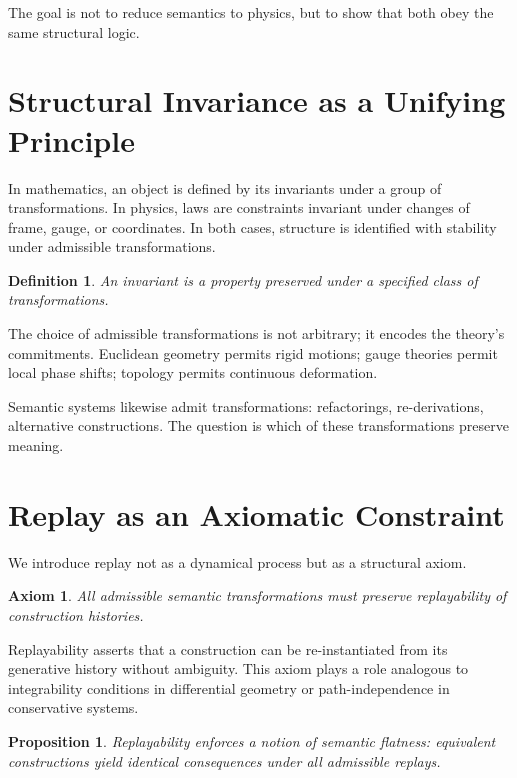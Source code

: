 \documentclass[11pt]{article}
\newtheorem{definition}{Definition}[section]
\newtheorem{axiom}{Axiom}[section]
\newtheorem{proposition}{Proposition}[section]
\begin{document}
The goal is not to reduce semantics to physics, but to show that both obey the same structural logic.

\section{Structural Invariance as a Unifying Principle}

In mathematics, an object is defined by its invariants under a group of transformations. In physics, laws are constraints invariant under changes of frame, gauge, or coordinates. In both cases, structure is identified with stability under admissible transformations.

\begin{definition}
An invariant is a property preserved under a specified class of transformations.
\end{definition}

The choice of admissible transformations is not arbitrary; it encodes the theory’s commitments. Euclidean geometry permits rigid motions; gauge theories permit local phase shifts; topology permits continuous deformation.

Semantic systems likewise admit transformations: refactorings, re-derivations, alternative constructions. The question is which of these transformations preserve meaning.

\section{Replay as an Axiomatic Constraint}

We introduce replay not as a dynamical process but as a structural axiom.

\begin{axiom}
All admissible semantic transformations must preserve replayability of construction histories.
\end{axiom}

Replayability asserts that a construction can be re-instantiated from its generative history without ambiguity. This axiom plays a role analogous to integrability conditions in differential geometry or path-independence in conservative systems.

\begin{proposition}
Replayability enforces a notion of semantic flatness: equivalent constructions yield identical consequences under all admissible replays.
\end{proposition}
\end{document}
